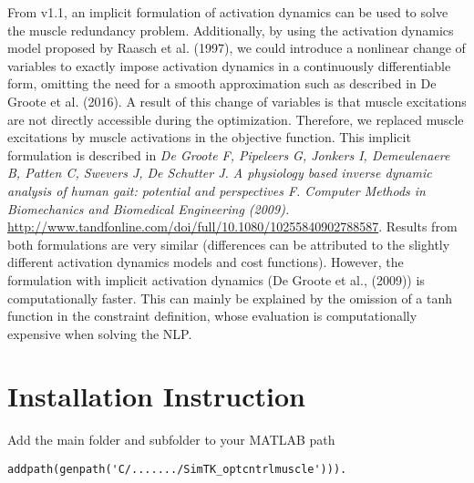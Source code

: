 \documentclass[a4paper,oneside,11pt]{article}
\begin{document}
From v1.1, an implicit formulation of activation dynamics can be used to solve the muscle redundancy problem. Additionally, by using the activation dynamics model proposed by Raasch et al. (1997), we could introduce a nonlinear change of variables to exactly impose activation dynamics in a continuously differentiable form, omitting the need for a smooth approximation such as described in De Groote et al. (2016). A result of this change of variables is that muscle excitations are not directly accessible during the optimization. Therefore, we replaced muscle excitations by muscle activations in the objective function. This implicit formulation is described in \textit{De Groote F, Pipeleers G, Jonkers I, Demeulenaere B, Patten C, Swevers J, De Schutter J. A physiology based inverse dynamic analysis of human gait: potential and perspectives F. Computer Methods in Biomechanics and Biomedical Engineering (2009).} \url{http://www.tandfonline.com/doi/full/10.1080/10255840902788587}. Results from both formulations are very similar (differences can be attributed to the slightly different activation dynamics models and cost functions). However, the formulation with implicit activation dynamics (De Groote et al., (2009)) is computationally faster. This can mainly be explained by the omission of a tanh function in the constraint definition, whose evaluation is computationally expensive when solving the NLP.


\section{Installation Instruction}

Add the main folder and subfolder to your MATLAB path 
\begin{lstlisting}
addpath(genpath('C/......./SimTK_optcntrlmuscle'))).
\end{lstlisting}
\end{document}
